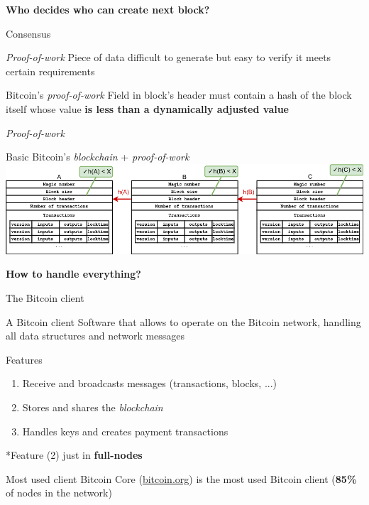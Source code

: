 \documentclass{beamer}
\begin{document}
\begin{frame}
 \begin{center}
  \textbf{Who decides who can create next block?}
 \end{center}
\end{frame}
\begin{frame}{Consensus}
 \begin{block}{\textit{Proof-of-work}}
  Piece of data difficult to generate but easy to verify it meets certain
  requirements
 \end{block}
 \begin{block}{Bitcoin's \textit{proof-of-work}}
  Field in block's header must contain a hash of the block itself whose
  value \textbf{is less than a dynamically adjusted value}
 \end{block}
\end{frame}
\begin{frame}{\textit{Proof-of-work}}
 \begin{exampleblock}{Basic Bitcoin's \textit{blockchain} + \textit{proof-of-work}}
  \includegraphics[width=\textwidth, height=0.8\textheight, keepaspectratio]{img/basic_blockchain_consensus.png}
 \end{exampleblock}
\end{frame}
\begin{frame}
 \begin{center}
  \textbf{How to handle everything?}
 \end{center}
\end{frame}
\begin{frame}{The Bitcoin client}
 \begin{block}{A Bitcoin client}
  Software that allows to operate on the Bitcoin network, handling all data structures and network messages
 \end{block}
 \begin{block}{Features}
  \begin{enumerate}
   \item Receive and broadcasts messages (transactions, blocks, ...)
   \item Stores and shares the \textit{blockchain}
   \item Handles keys and creates payment transactions
  \end{enumerate}
  *Feature (2) just in \textbf{full-nodes}
 \end{block}
 \begin{exampleblock}{Most used client}
  Bitcoin Core (\url{bitcoin.org}) is the most used Bitcoin client (\textbf{85\%} of nodes in the network)
 \end{exampleblock}
\end{frame}
\end{document}
